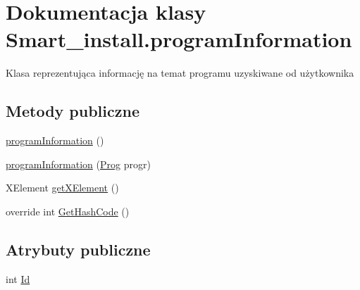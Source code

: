 \hypertarget{class_smart__install_1_1program_information}{\section{Dokumentacja klasy Smart\+\_\+install.\+program\+Information}
\label{class_smart__install_1_1program_information}
}


Klasa reprezentująca informację na temat programu uzyskiwane od użytkownika  


\subsection*{Metody publiczne}
\begin{DoxyCompactItemize}
\item 
\hyperlink{class_smart__install_1_1program_information_a5ebc2c3214f9f4dea2a95a4bed6e5860}{program\+Information} ()
\item 
\hyperlink{class_smart__install_1_1program_information_aee2ee2515e244d0e11f98acb71287a43}{program\+Information} (\hyperlink{class_smart__install_1_1_prog}{Prog} progr)
\item 
X\+Element \hyperlink{class_smart__install_1_1program_information_a0703329b524464a24398de7fb83e5b66}{get\+X\+Element} ()
\item 
override int \hyperlink{class_smart__install_1_1program_information_a64edbdda5c8d1ae7f3727598b1b82431}{Get\+Hash\+Code} ()
\end{DoxyCompactItemize}
\subsection*{Atrybuty publiczne}
\begin{DoxyCompactItemize}
\item 
int \hyperlink{class_smart__install_1_1program_information_a83edf66af382b3a4e9c1bf2dc94965f2}{Id}
\end{DoxyCompactItemize}

